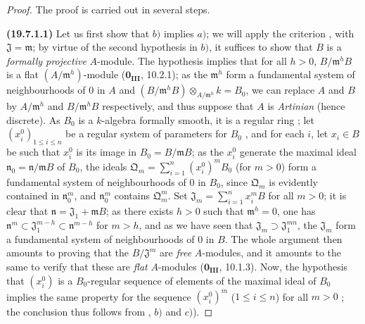 \begin{proof}
The proof is carried out in several steps.

\medskip
\noindent\textbf{(19.7.1.1)}\enspace
Let us first show that $b)$ implies $a)$; we will apply the criterion , with $\mathfrak{J}=\mathfrak{m}$; by virtue of the second hypothesis in $b)$, it suffices to show that $B$ is a \emph{formally projective} $A$-module.
The hypothesis implies that for all $h>0$, $B/\mathfrak{m}^h B$ is a flat $(A/\mathfrak{m}^h)$-module ($\mathbf{0_{III}}$, 10.2.1); as the $\mathfrak{m}^h$ form a fundamental system of neighbourhoods of $0$ in $A$ and $(B/\mathfrak{m}^h B)\otimes_{A/\mathfrak{m}^h} k = B_0$, we can replace $A$ and $B$ by $A/\mathfrak{m}^h$ and $B/\mathfrak{m}^h B$ respectively, and thus suppose that $A$ is \emph{Artinian} (hence discrete).
As $B_0$ is a $k$-algebra formally smooth, it is a regular ring ; let $(x_i^0)_{1\leq i\leq n}$ be a regular system of parameters for $B_0$ ,
and for each $i$, let $x_i\in B$ be such that $x_i^0$ is its image in $B_0=B/\mathfrak{m}B$; as the $x_i^0$ generate the maximal ideal $\mathfrak{n}_0=\mathfrak{n}/\mathfrak{m}B$ of $B_0$, the ideals $\mathfrak{Q}_m=\sum_{i=1}^n (x_i^0)^m B_0$ (for $m>0$) form a fundamental system of neighbourhoods of $0$ in $B_0$, since $\mathfrak{Q}_m$ is evidently contained in $\mathfrak{n}_0^m$, and $\mathfrak{n}_0^m$ contains $\mathfrak{Q}_m^m$.
Set $\mathfrak{J}_m=\sum_{i=1}^n x_i^m B$ for all $m>0$;
it is clear that $\mathfrak{n}=\mathfrak{J}_1+\mathfrak{m}B$; as there exists $h>0$ such that $\mathfrak{m}^h=0$, one has $\mathfrak{n}^m\subset\mathfrak{J}_1^{m-h}\subset\mathfrak{n}^{m-h}$ for $m>h$, and as we have seen that $\mathfrak{J}_m\supset\mathfrak{J}_1^{mn}$, the $\mathfrak{J}_m$ form a fundamental system of neighbourhoods of $0$ in $B$.
The whole argument then amounts to proving that the $B/\mathfrak{J}^m$ are \emph{free} $A$-modules, and it amounts to the same to verify that these are \emph{flat} $A$-modules ($\mathbf{0_{III}}$, 10.1.3).
Now, the hypothesis that $(x_i^0)$ is a $B_0$-regular sequence of elements of the maximal ideal of $B_0$ implies the same property for the sequence $(x_i^0)^m$ ($1\leq i\leq n$) for all $m>0$ ; the conclusion thus follows from , $b)$ and $c)$).
\end{proof}

